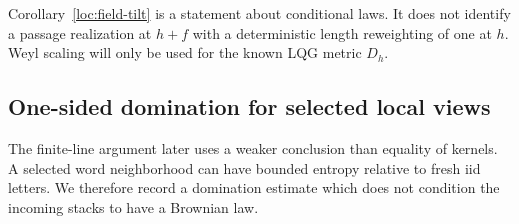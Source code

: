 \begin{remark}
Corollary~\ref{loc:field-tilt} is a statement about conditional laws.
It does not identify a passage realization at $h+f$ with a deterministic
length reweighting of one at $h$.  Weyl scaling will only be used for
the known LQG metric $D_h$.
\end{remark}

\subsection{One-sided domination for selected local views}

The finite-line argument later uses a weaker conclusion than equality of
kernels.  A selected word neighborhood can have bounded entropy relative
to fresh iid letters.  We therefore record a domination estimate which
does not condition the incoming stacks to have a Brownian law.

